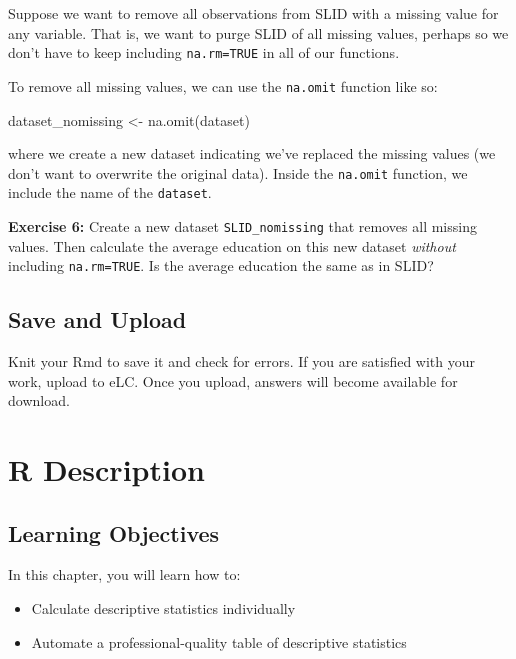 \documentclass[
]{book}
\makeatletter
\newenvironment{Shaded}{\begin{snugshade}}{\end{snugshade}}
\newcommand{\FunctionTok}[1]{\textcolor[rgb]{0,0,0}{#1}}
\newcommand{\NormalTok}[1]{#1}
\newcommand{\OtherTok}[1]{\textcolor[rgb]{0.37,0.37,0.37}{#1}}
\providecommand{\tightlist}{%
  \setlength{\itemsep}{0pt}\setlength{\parskip}{0pt}}
\newenvironment{kframe}{%
\medskip{}
\setlength{\fboxsep}{.8em}
 \def\at@end@of@kframe{}%
 \ifinner\ifhmode%
  \def\at@end@of@kframe{\end{minipage}}%
  \begin{minipage}{\columnwidth}%
 \fi\fi%
 \def\FrameCommand##1{\hskip\@totalleftmargin \hskip-\fboxsep
 \colorbox{shadecolor}{##1}\hskip-\fboxsep
     \hskip-\linewidth \hskip-\@totalleftmargin \hskip\columnwidth}%
 \MakeFramed {\advance\hsize-\width
   \@totalleftmargin\z@ \linewidth\hsize
   \@setminipage}}%
 {\par\unskip\endMakeFramed%
 \at@end@of@kframe}
\renewenvironment{Shaded}{\begin{kframe}}{\end{kframe}}
\newenvironment{rmdblock}[1]
  {\begin{shaded*}
  }
  {\end{shaded*}
  }
\newenvironment{learncheck}
  {\begin{rmdblock}{warning}}
  {\end{rmdblock}}
\makeatother
\begin{document}
Suppose we want to remove all observations from SLID with a missing value for any variable. That is, we want to purge SLID of all missing values, perhaps so we don't have to keep including \texttt{na.rm=TRUE} in all of our functions.

To remove all missing values, we can use the \texttt{na.omit} function like so:

\begin{Shaded}
\begin{Highlighting}[]
\NormalTok{dataset\_nomissing }\OtherTok{\textless{}{-}} \FunctionTok{na.omit}\NormalTok{(dataset)}
\end{Highlighting}
\end{Shaded}

where we create a new dataset indicating we've replaced the missing values (we don't want to overwrite the original data). Inside the \texttt{na.omit} function, we include the name of the \texttt{dataset}.

\begin{learncheck}
\textbf{Exercise 6:} Create a new dataset \texttt{SLID\_nomissing} that
removes all missing values. Then calculate the average education on this
new dataset \emph{without} including \texttt{na.rm=TRUE}. Is the average
education the same as in SLID?
\end{learncheck}

\hypertarget{save-and-upload}{%
\section{Save and Upload}\label{save-and-upload}}

Knit your Rmd to save it and check for errors. If you are satisfied with your work, upload to eLC. Once you upload, answers will become available for download.

\hypertarget{r-description}{%
\chapter{R Description}\label{r-description}}

\hypertarget{learning-objectives}{%
\section{Learning Objectives}\label{learning-objectives}}

In this chapter, you will learn how to:

\begin{itemize}
\tightlist
\item
  Calculate descriptive statistics individually
\item
  Automate a professional-quality table of descriptive statistics
\end{itemize}
\end{document}

